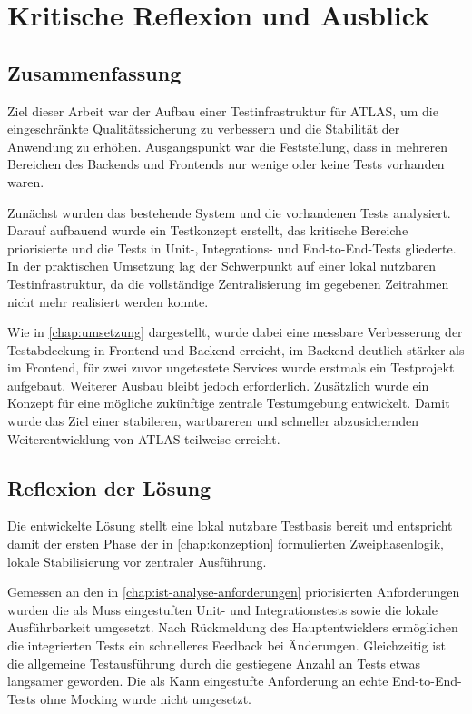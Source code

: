
\chapter{Kritische Reflexion und Ausblick}
\label{chap:reflexion-ausblick}

\section{Zusammenfassung}
Ziel dieser Arbeit war der Aufbau einer Testinfrastruktur für ATLAS, um die eingeschränkte Qualitätssicherung zu verbessern und die Stabilität der Anwendung zu erhöhen. Ausgangspunkt war die Feststellung, dass in mehreren Bereichen des Backends und Frontends nur wenige oder keine Tests vorhanden waren.

Zunächst wurden das bestehende System und die vorhandenen Tests analysiert. Darauf aufbauend wurde ein Testkonzept erstellt, das kritische Bereiche priorisierte und die Tests in Unit-, Integrations- und End-to-End-Tests gliederte. In der praktischen Umsetzung lag der Schwerpunkt auf einer lokal nutzbaren Testinfrastruktur, da die vollständige Zentralisierung im gegebenen Zeitrahmen nicht mehr realisiert werden konnte.

Wie in \autoref{chap:umsetzung} dargestellt, wurde dabei eine messbare Verbesserung der Testabdeckung in Frontend und Backend erreicht, im Backend deutlich stärker als im Frontend, für zwei zuvor ungetestete Services wurde erstmals ein Testprojekt aufgebaut. Weiterer Ausbau bleibt jedoch erforderlich. Zusätzlich wurde ein Konzept für eine mögliche zukünftige zentrale Testumgebung entwickelt. Damit wurde das Ziel einer stabileren, wartbareren und schneller abzusichernden Weiterentwicklung von \ac{ATLAS} teilweise erreicht.

\section{Reflexion der Lösung}
Die entwickelte Lösung stellt eine lokal nutzbare Testbasis bereit und entspricht damit der ersten Phase der in \autoref{chap:konzeption} formulierten Zweiphasenlogik, lokale Stabilisierung vor zentraler Ausführung.

Gemessen an den in \autoref{chap:ist-analyse-anforderungen} priorisierten Anforderungen wurden die als Muss eingestuften Unit- und Integrationstests sowie die lokale Ausführbarkeit umgesetzt. Nach Rückmeldung des Hauptentwicklers ermöglichen die integrierten Tests ein schnelleres Feedback bei Änderungen. Gleichzeitig ist die allgemeine Testausführung durch die gestiegene Anzahl an Tests etwas langsamer geworden. Die als Kann eingestufte Anforderung an echte End-to-End-Tests ohne Mocking wurde nicht umgesetzt.

